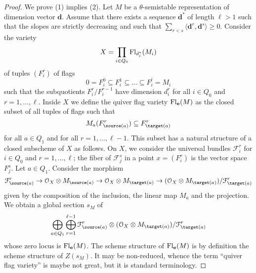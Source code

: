 \documentclass[a4paper]{article}
\begin{document}
\begin{proof}
    We prove (1) implies (2). Let $M$ be a $\theta$-semistable representation of dimension vector $\mathbf{d}$. Assume that there exists a sequence $\mathbf{d}^*$ of length $\ell > 1$ such that the slopes are strictly decreasing and such that $\sum_{r < s} \langle \mathbf{d}^r,\mathbf{d}^s \rangle \geq 0$. Consider the variety
    \[
        X = \prod_{i \in Q_0} \operatorname{Fl}_{d_i^*}(M_i)    
    \]
    of tuples $(F_i^r)$ of flags
    \[
        0 = F_i^0 \subseteq F_i^1 \subseteq \ldots \subseteq F_i^l = M_i     
    \]
    such that the subquotients $F_i^r/F_i^{r-1}$ have dimension $d_i^r$ for all $i \in Q_0$ and $r = 1,\ldots,\ell$. Inside $X$ we define the quiver flag variety $\operatorname{Fl}_\mathbf{e}(M)$ as the closed subset of all tuples of flags such that 
    \[
        M_a(F_{\source(a)}^r) \subseteq F_{\target(a)}^r     
    \]
    for all $a \in Q_1$ and for all $r=1,\ldots,\ell-1$. This subset has a natural structure of a closed subscheme of $X$ as follows. On $X$, we consider the universal bundles $\mathcal{F}_i^r$ for $i \in Q_0$ and $r=1,\ldots,\ell$; the fiber of $\mathcal{F}_j^s$ in a point $x = (F_i^r)$ is the vector space $F_j^s$. Let $a \in Q_1$. Consider the morphism
    \[
        \mathcal{F}_{\source(a)}^r \to \mathcal{O}_X \otimes M_{\source(a)} \to \mathcal{O}_X \otimes M_{\target(a)} \to (\mathcal{O}_X \otimes M_{\target(a)})/\mathcal{F}_{\target(a)}^r     
    \]
    given by the composition of the inclusion, the linear map $M_a$ and the projection. We obtain a global section $s_M$  of 
    \[
        \bigoplus_{a \in Q_1} \bigoplus_{r=1}^{\ell-1} \mathcal{F}_{\source(a)}^r \otimes (\mathcal{O}_X \otimes M_{\target(a)})/\mathcal{F}_{\target(a)}^r
    \]
    whose zero locus is $\operatorname{Fl}_\mathbf{e}(M)$. The scheme structure of $\operatorname{Fl}_\mathbf{e}(M)$ is by definition the scheme structure of $Z(s_M)$. It may be non-reduced, whence the term ``quiver flag variety'' is maybe not great, but it is standard terminology.
\end{proof}

\end{document}
